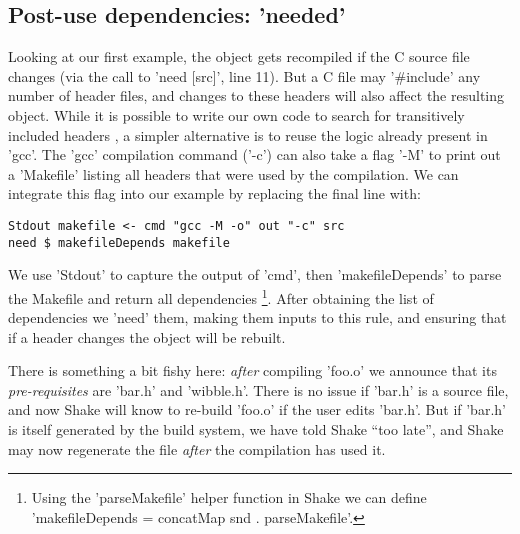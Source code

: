 \subsection{Post-use dependencies: \lst'needed'\label{sec:needed}}

Looking at our first example, the object gets recompiled if the C source file
changes (via the call to \lst'need [src]', line 11).
But a C file may \lst'#include' any number of header files, and changes
to these headers will also affect the resulting object. While it is possible to
write our own code to search for transitively included headers
\cite[\S6.4]{shake}, a simpler alternative is to reuse the logic already present
in \lst'gcc'. The \lst'gcc' compilation command (\lst'-c') can also take a flag
\lst'-M' to print out a \lst'Makefile' listing all headers that were used by the
compilation. We can integrate this flag into our example by replacing the final
line with:

\begin{lstlisting}
Stdout makefile <- cmd "gcc -M -o" out "-c" src
need $ makefileDepends makefile
\end{lstlisting}

\noindent We use \lst'Stdout' to capture the output of \lst'cmd', then
\lst'makefileDepends' to parse the Makefile and return all dependencies
\footnote{Using the \lst'parseMakefile' helper function in Shake we can define
\lst'makefileDepends = concatMap snd . parseMakefile'.}. After obtaining the
list of dependencies we \lst'need' them, making them inputs to this rule, and
ensuring that if a header changes the object will be rebuilt.

There is something a bit fishy here: \emph{after} compiling \lst'foo.o' we
announce that its \emph{pre-requisites} are \lst'bar.h' and \lst'wibble.h'.
There is no issue if \lst'bar.h' is a source file, and now
Shake will know to re-build \lst'foo.o' if the user edits \lst'bar.h'.
But if \lst'bar.h' is itself generated by the build system,
we have told Shake ``too late'', and Shake may now regenerate the file
\emph{after} the compilation has used it.


